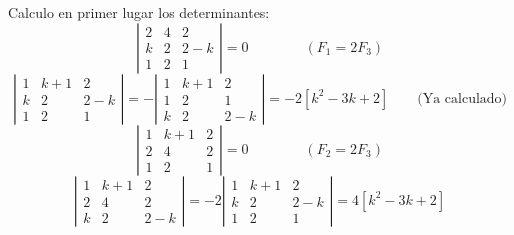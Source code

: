 \documentclass[12pt]{article}
\begin{document}
\begin{ejercicio}
\begin{enumerate}
\begin{itemize}
            Calculo en primer lugar los determinantes:
            \begin{equation*}
                \left|\begin{array}{ccc}
                    2 & 4 & 2 \\
                    k & 2 & 2-k \\
                    1 & 2 & 1
                \end{array}\right| = 0 \qquad \qquad (F_1=2F_3)
            \end{equation*}
            \begin{equation*}
                \left|\begin{array}{ccc}
                    1 & k+1 & 2 \\
                    k & 2 & 2-k \\
                    1 & 2 & 1
                \end{array}\right|
                =-\left|\begin{array}{ccc}
                    1 & k+1 & 2 \\
                    1 & 2 & 1 \\
                    k & 2 & 2-k
                \end{array}\right| = -2[k^2 -3k +2] \qquad \text{(Ya calculado)}
            \end{equation*}
            \begin{equation*}
                \left|\begin{array}{ccc}
                    1 & k+1 & 2 \\
                    2 & 4 & 2 \\
                    1 & 2 & 1
                \end{array}\right| = 0 \qquad \qquad (F_2=2F_3)
            \end{equation*}
            \begin{equation*}
                \left|\begin{array}{ccc}
                    1 & k+1 & 2 \\
                    2 & 4 & 2 \\
                    k & 2 & 2-k
                \end{array}\right|
                = -2\left|\begin{array}{ccc}
                    1 & k+1 & 2 \\
                    k & 2 & 2-k \\
                    1 & 2 & 1
                \end{array}\right|
                = 4[k^2 -3k +2]
            \end{equation*}


\end{itemize}
\end{enumerate}
\end{ejercicio}
\end{document}
